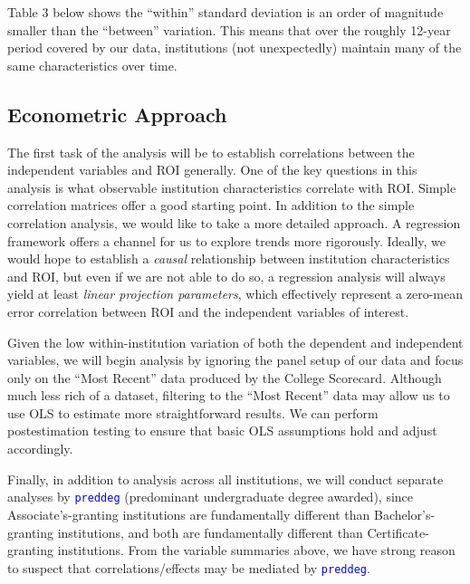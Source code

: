 \documentclass[12pt]{article}
\numberwithin{equation}{section}
\newcommand{\Varnm}[1]{\texttt{\textcolor{Blue}{#1}}}
\begin{document}
Table 3 below shows the \enquote{within} standard deviation is an order of magnitude smaller than the \enquote{between} variation. This means that over the roughly 12-year period covered by our data, institutions (not unexpectedly) maintain many of the same characteristics over time.
\newpage


\subsection{Econometric Approach}
The first task of the analysis will be to establish correlations between the independent variables and ROI generally. One of the key questions in this analysis is what observable institution characteristics correlate with ROI. Simple correlation matrices offer a good starting point. In addition to the simple correlation analysis, we would like to take a more detailed approach. A regression framework offers a channel for us to explore trends more rigorously. Ideally, we would hope to establish a \textit{causal} relationship between institution characteristics and ROI, but even if we are not able to do so, a regression analysis will always yield at least \textit{linear projection parameters}, which effectively represent a zero-mean error correlation between ROI and the independent variables of interest.

Given the low within-institution variation of both the dependent and independent variables, we will begin analysis by ignoring the panel setup of our data and focus only on the \enquote{Most Recent} data produced by the College Scorecard. Although much less rich of a dataset, filtering to the \enquote{Most Recent} data may allow us to use OLS to estimate more straightforward results. We can perform postestimation testing to ensure that basic OLS assumptions hold and adjust accordingly.

Finally, in addition to analysis across all institutions, we will conduct separate analyses by \Varnm{preddeg} (predominant undergraduate degree awarded), since Associate's-granting institutions are fundamentally different than Bachelor's-granting institutions, and both are fundamentally different than Certificate-granting institutions. From the variable summaries above, we have strong reason to suspect that correlations/effects may be mediated by \Varnm{preddeg}.
\end{document}
